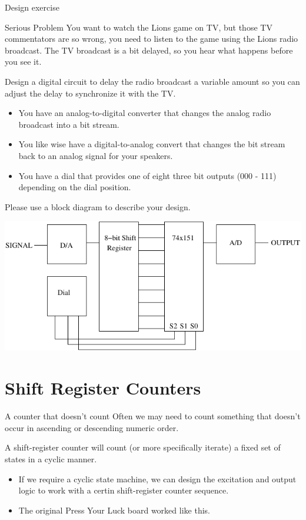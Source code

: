 \begin{frame}{Design exercise}
  \begin{block}{Serious Problem}
    You want to watch the Lions game on TV, but those TV commentators are so wrong, you need to listen to the game using the Lions radio broadcast.  The TV broadcast is a bit delayed, so you hear what happens before you see it.
  \end{block}
  Design a digital circuit to delay the radio broadcast a variable amount so you can adjust the delay to synchronize it with the TV.
  \begin{itemize}
    \item You have an analog-to-digital converter that changes the analog radio broadcast into a bit stream.
    \item You like wise have a digital-to-analog convert that changes the bit stream back to an analog signal for your speakers.
    \item You have a dial that provides one of eight three bit outputs (000 - 111) depending on the dial position.
  \end{itemize}
\end{frame}

Please use a block diagram to describe your design.
\begin{center}
  \includegraphics{SignalDelay}
\end{center}

\section{Shift Register Counters}

\begin{frame}{A counter that doesn't count}
  Often we may need to count something that doesn't occur in ascending or descending numeric order.
  \begin{definition}
    A \alert{shift-register counter} will count (or more specifically iterate) a fixed set of states in a cyclic manner.
  \end{definition}
  \begin{itemize}
    \item If we require a cyclic state machine, we can design the excitation and output logic to work with a certin shift-register counter sequence.
    \item The original Press Your Luck board worked like this.
  \end{itemize}
\end{frame}

